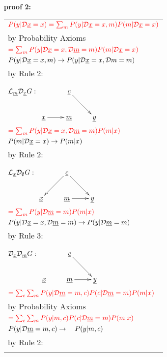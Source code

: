 {\bf * proof 2:}
\begin{longtable}{l}
$\color{red}
P(y|{\cal D}{\underline{x}}=x)=
\sum_m
P(y|{\cal D}{\underline{x}}=x, m)
P(m|{\cal D}{\underline{x}}=x)$
\\
\quad by Probability Axioms
\\
$\color{red}=
\sum_m
P(y|{\cal D}{\underline{x}}=x, {\cal D}{\underline{m}}=m)
P(m|{\cal D}{\underline{x}}=x)$
\\
\quad $P(y|{\cal D}{\underline{x}}=x, m)\rightarrow
P(y|{\cal D}{\underline{x}}=x, {\cal D} m=m)$
\\
\quad by Rule 2:
\begin{tabular}{l}
\\
\end{tabular}
\\
\quad ${\cal L}_{\underline{m}}{\cal D}_{\underline{x}} G:$
$\xymatrix{
&{\rvc}\ar[rd]
\\
\rvx\ar[r]
&\rvm
&\rvy
}$
\\
$\color{red}=
\sum_m
P(y|{\cal D}{\underline{x}}=x, {\cal D}{\underline{m}}=m)
P(m| x)$
\\
\quad $P(m|{\cal D}{\underline{x}}=x)\rightarrow P(m|x)$
\\
\quad by Rule 2:
\begin{tabular}{l}
\\
\end{tabular}
\\
\quad ${\cal L}_{\underline{x}}{\cal D}_\emptyset G:$
$\xymatrix{
&{\rvc}\ar[ld]\ar[rd]
\\
\rvx
&\rvm\ar[r]
&\rvy
}$
\\
$\color{red}=
\sum_m
P(y|{\cal D}{\underline{m}}=m)
P(m|x)$
\\
\quad $P(y|{\cal D}{\underline{x}}=x, {\cal D}{\underline{m}}=m)
\rightarrow
 P(y|{\cal D}{\underline{m}}=m)$
\\
\quad by Rule 3:
\begin{tabular}{l}
\\
\end{tabular}
\\
\quad
${\cal D}_{\underline{x}}{\cal D}_{\underline{m}} G:$
$\xymatrix{
&{\rvc}\ar[rd]
\\
\rvx
&\rvm\ar[r]
&\rvy
}$
\\
$\color{red}=
\sum_{c}
\sum_m
P(y|{\cal D}{\underline{m}}=m, c)
P(c|{\cal D}{\underline{m}}=m)
P(m|x)$
\\
\quad by Probability Axioms
\\
$\color{red}=
\sum_{c}
\sum_m
P(y|m, c)
P(c|{\cal D}{\underline{m}}=m)
P(m|x)$
\\
\quad $P(y|{\cal D}{\underline{m}}=m, c)
\rightarrow
\quad P(y|m, c)$
\\
\quad by Rule 2:
\begin{tabular}{l}
\\

\end{tabular}
\end{longtable}
